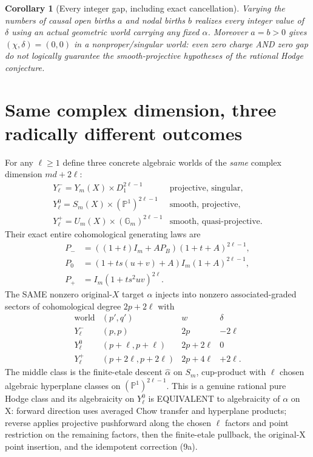 \documentclass[11pt]{article}
\newtheorem{corollary}{Corollary}
\begin{document}
\begin{corollary}[Every integer gap, including exact cancellation]
Varying the numbers of causal open births $a$ and nodal births
$b$ realizes \emph{every integer value of $\delta$}
using an actual geometric world carrying any fixed $\alpha$.
Moreover $a=b>0$ gives $(\chi,\delta)=(0,0)$ in a
nonproper/singular world: even zero charge AND zero gap
do not logically guarantee the smooth-projective
hypotheses of the rational Hodge conjecture.
\end{corollary}

\section{Same complex dimension, three radically different outcomes}
For any $\ell\ge1$ define three concrete algebraic
worlds of the \emph{same} complex dimension $md+2\ell$:
\[
 \begin{array}{lll}
 Y^-_\ell=Y_m(X)\times D_1^{2\ell-1}
   &\text{projective, singular},\\
 Y^0_\ell=S_m(X)\times(\mathbb P^1)^{2\ell-1}
   &\text{smooth, projective},\\
 Y^+_\ell=U_m(X)\times(\mathbb G_m)^{2\ell-1}
   &\text{smooth, quasi-projective}.
 \end{array}                                             \tag{13}
\]
Their exact entire cohomological generating laws are
\[
 \boxed{\begin{aligned}
 P_-&=((1+t)I_m+A P_B)(1+t+A)^{2\ell-1},\\
 P_0&=(1+ts(u+v)+A)I_m(1+A)^{2\ell-1},\\
 P_+&=I_m(1+ts^2uv)^{2\ell}.
 \end{aligned}}                                          \tag{14}
\]
The SAME nonzero original-$X$ target $\alpha$ injects
into nonzero associated-graded sectors of cohomological
degree $2p+2\ell$ with
\[
 \boxed{
 \begin{array}{c|c|c|c}
    \text{world}&(p',q')&w&\delta\\ \hline
    Y^-_\ell&(p,p)&2p&-2\ell\\
    Y^0_\ell&(p+\ell,p+\ell)&2p+2\ell&0\\
    Y^+_\ell&(p+2\ell,p+2\ell)&2p+4\ell&+2\ell.
 \end{array}}                                             \tag{15}
\]
The middle class is the finite-etale descent
$\widehat\alpha$ on $S_m$, cup-product with
$\ell$ chosen algebraic hyperplane classes on
$(\mathbb P^1)^{2\ell-1}$. This is a genuine rational
pure Hodge class and its algebraicity on $Y^0_\ell$
is EQUIVALENT to algebraicity of $\alpha$ on X:
forward direction uses averaged Chow transfer and
hyperplane products; reverse applies projective
pushforward along the chosen $\ell$ factors and
point restriction on the remaining factors, then
the finite-etale pullback, the original-X point
insertion, and the idempotent correction (9a).
\end{document}
